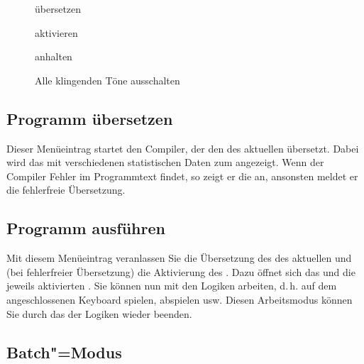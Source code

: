 \begin{description}
\item[]
   übersetzen
\item[]
   aktivieren
\item[]
   anhalten 
\item[] Alle klingenden Töne ausschalten
\end{description}

\subsection{Programm übersetzen}
\label{sec:MI_COMPILE}


Dieser Menüeintrag startet den Compiler, der den
 des aktuellen
 übersetzt. Dabei wird das
 mit verschiedenen
statistischen Daten zum 
angezeigt. Wenn der Compiler Fehler im Programmtext findet, so zeigt
er die an, ansonsten meldet er die fehlerfreie Übersetzung.

\subsection{Programm ausführen}
\label{sec:MI_ACTIVATE}

Mit diesem Menüeintrag veranlassen Sie die Übersetzung des
 des aktuellen
 und (bei fehlerfreier
Übersetzung) die Aktivierung des
. Dazu öffnet sich das
 und die jeweils aktivierten
. Sie können nun mit den
Logiken arbeiten, d.\,h. auf dem angeschlossenen Keyboard spielen,
 abspielen usw.  Diesen
Arbeitsmodus können Sie durch das  der
Logiken wieder beenden.

\subsection{Batch"=Modus}


